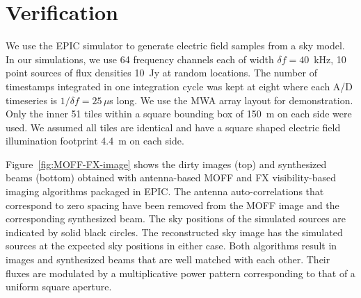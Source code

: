 \documentclass[a4paper,fleqn,usenatbib]{../mnras}
\begin{document}
\section{Verification}\label{sec:verify}

We use the EPIC simulator to generate electric field samples from a sky model. In
our simulations, we use 64 frequency channels each of width $\delta f = 40$~kHz, 
10 point sources of flux densities 10~Jy at random locations. The number of
timestamps integrated in one integration cycle was kept at eight where each A/D 
timeseries is $1/\delta f=25\,\mu$s long. We use the MWA array layout 
\citep{bea12} for demonstration. Only the inner 51 tiles within a square bounding
box of 150~m on each side were used. We assumed all tiles are identical and have 
a square shaped electric field illumination footprint 4.4~m on each side. 

Figure~\ref{fig:MOFF-FX-image} shows the dirty images (top) and synthesized beams
(bottom) obtained with antenna-based MOFF and FX visibility-based imaging 
algorithms packaged in EPIC. The antenna auto-correlations that correspond to 
zero spacing have been removed from the MOFF image and the corresponding 
synthesized beam. The sky positions of the simulated sources are indicated by 
solid black circles. The reconstructed sky image has the simulated sources at the
expected sky positions in either case. Both algorithms result in images and 
synthesized beams that are well matched with each other. Their fluxes are 
modulated by a multiplicative power pattern corresponding to that of a uniform
square aperture. 
\end{document}
